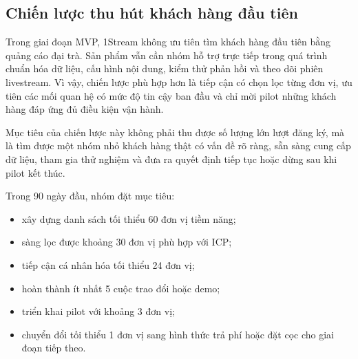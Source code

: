 %
%
%


\subsection{Chiến lược thu hút khách hàng đầu tiên}

Trong giai đoạn MVP, 1Stream không ưu tiên tìm khách hàng đầu tiên bằng quảng cáo đại trà. Sản phẩm vẫn cần nhóm hỗ trợ trực tiếp trong quá trình chuẩn hóa dữ liệu, cấu hình nội dung, kiểm thử phản hồi và theo dõi phiên livestream. Vì vậy, chiến lược phù hợp hơn là tiếp cận có chọn lọc từng đơn vị, ưu tiên các mối quan hệ có mức độ tin cậy ban đầu và chỉ mời pilot những khách hàng đáp ứng đủ điều kiện vận hành.

Mục tiêu của chiến lược này không phải thu được số lượng lớn lượt đăng ký, mà là tìm được một nhóm nhỏ khách hàng thật có vấn đề rõ ràng, sẵn sàng cung cấp dữ liệu, tham gia thử nghiệm và đưa ra quyết định tiếp tục hoặc dừng sau khi pilot kết thúc.

Trong 90 ngày đầu, nhóm đặt mục tiêu:

\begin{itemize}
    \item xây dựng danh sách tối thiểu 60 đơn vị tiềm năng;
    \item sàng lọc được khoảng 30 đơn vị phù hợp với ICP;
    \item tiếp cận cá nhân hóa tối thiểu 24 đơn vị;
    \item hoàn thành ít nhất 5 cuộc trao đổi hoặc demo;
    \item triển khai pilot với khoảng 3 đơn vị;
    \item chuyển đổi tối thiểu 1 đơn vị sang hình thức trả phí hoặc đặt cọc cho giai đoạn tiếp theo.
\end{itemize}

